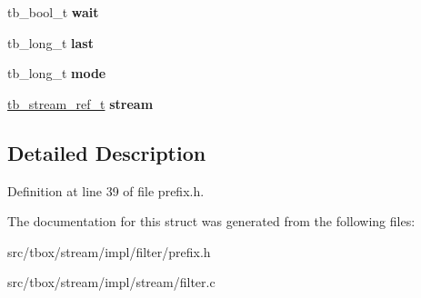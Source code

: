\begin{DoxyCompactItemize}
\item 
\hypertarget{structtb__stream__filter__impl__t_a94a14280d0983ac46730702c2c47d9b9}{tb\-\_\-bool\-\_\-t {\bfseries wait}}\label{structtb__stream__filter__impl__t_a94a14280d0983ac46730702c2c47d9b9}

\item 
\hypertarget{structtb__stream__filter__impl__t_a475866c9fa58e44d73e627a2c592747a}{tb\-\_\-long\-\_\-t {\bfseries last}}\label{structtb__stream__filter__impl__t_a475866c9fa58e44d73e627a2c592747a}

\item 
\hypertarget{structtb__stream__filter__impl__t_a19759c3920d7e2014fc344ff61b82e5b}{tb\-\_\-long\-\_\-t {\bfseries mode}}\label{structtb__stream__filter__impl__t_a19759c3920d7e2014fc344ff61b82e5b}

\item 
\hypertarget{structtb__stream__filter__impl__t_a4a0cf1a77b03d4f9d6944110e3666a48}{\hyperlink{structtb__stream__ref__t}{tb\-\_\-stream\-\_\-ref\-\_\-t} {\bfseries stream}}\label{structtb__stream__filter__impl__t_a4a0cf1a77b03d4f9d6944110e3666a48}

\end{DoxyCompactItemize}


\subsection{Detailed Description}


Definition at line 39 of file prefix.\-h.



The documentation for this struct was generated from the following files\-:\begin{DoxyCompactItemize}
\item 
src/tbox/stream/impl/filter/prefix.\-h\item 
src/tbox/stream/impl/stream/filter.\-c\end{DoxyCompactItemize}
